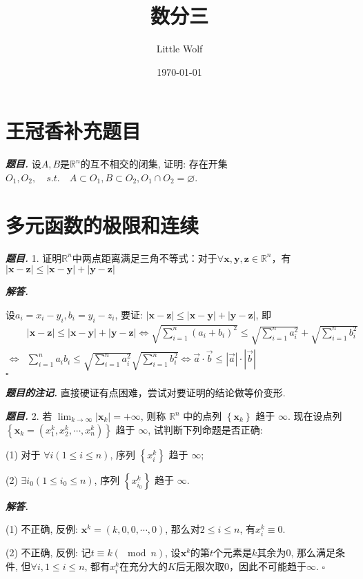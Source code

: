 \documentclass[10pt, a4paper, oneside]{ctexart}
\title{\textbf{数分三}}
\author{Little Wolf}
\date{\today}
\newenvironment{problem}{\begin{framed}\par\noindent\textbf{\textit{题目. }}}{\end{framed}\par}
\newenvironment{solution}{%
  \par\noindent\textbf{\textit{解答. }}\ignorespaces
}{%
  \hfill\ensuremath{\square}\par %
}
\newenvironment{note}{\par\noindent\textbf{\textit{题目的注记. }}\ignorespaces}{\par}
\begin{document}
\maketitle

\tableofcontents
\newpage

\section{王冠香补充题目}
\begin{problem}
    设$A,B$是$\mathbb{R}^n$的互不相交的闭集, 证明: 存在开集$O_1,O_2, \quad s.t.\quad A\subset O_1, B\subset O_2, O_1\cap O_2 = \varnothing$.
\end{problem}

\section{多元函数的极限和连续}

\begin{problem}
1. 证明$\mathbb{R}^n$中两点距离满足三角不等式：对于$\forall \bm{x},\bm{y},\bm{z}\in \mathbb{R}^n$，有$|\bm{x}-\bm{z}|\leq |\bm{x}-\bm{y}|+|\bm{y}-\bm{z}|$
\end{problem}

\begin{solution}
设$a_i=x_i-y_i, b_i=y_i-z_i$, 要证: $|\bm{x}-\bm{z}|\leq |\bm{x}-\bm{y}|+|\bm{y}-\bm{z}|$, 即
\begin{align*}
    &|\bm{x}-\bm{z}|\leq |\bm{x}-\bm{y}|+|\bm{y}-\bm{z}| \iff \sqrt{\sum_{i=1}^n (a_i+b_i)^2}\leq \sqrt{\sum_{i=1}^n a_i^2}+\sqrt{\sum_{i=1}^n b_i^2}\\\iff& \sum_{i=1}^n a_ib_i\leq \sqrt{\sum_{i=1}^n a_i^2}\sqrt{\sum_{i=1}^n b_i^2}\iff \vec{a}\cdot \vec{b}\leq |\vec{a}|\cdot|\vec{b}|
\end{align*}
\end{solution}
\begin{note}
    直接硬证有点困难，尝试对要证明的结论做等价变形.
\end{note}

\begin{problem}
2. 若 $\lim _{k \rightarrow \infty}\left|\boldsymbol{x}_k\right|=+\infty$, 则称 $\mathbb{R}^n$ 中的点列 $\left\{\boldsymbol{x}_k\right\}$ 趋于 $\infty$. 现在设点列 $\left\{\boldsymbol{x}_k=\left(x_1^k, x_2^k, \cdots, x_n^k\right)\right\}$ 趋于 $\infty$, 试判断下列命题是否正确:

(1) 对于 $\forall i(1 \leqslant i \leqslant n)$, 序列 $\left\{x_i^k\right\}$ 趋于 $\infty$;

(2) $\exists i_0\left(1 \leqslant i_0 \leqslant n\right)$, 序列 $\left\{x_{i_0}^k\right\}$ 趋于 $\infty$.
\end{problem}
\begin{solution}
    (1) 不正确, 反例: $\bm{x}^k=(k,0,0,\cdots,0)$, 那么对$2\leq i\leq n$, 有$x_i^k\equiv 0$.
    
    (2) 不正确, 反例: 记$t\equiv k (\mod n)$, 设$\bm{x}^k$的第$t$个元素是$k$其余为$0$, 那么满足条件, 但$\forall i, 1\leq i \leq n$, 都有$x_{i}^k$在充分大的$K$后无限次取$0$，因此不可能趋于$\infty$.
\end{solution}
\end{document}
